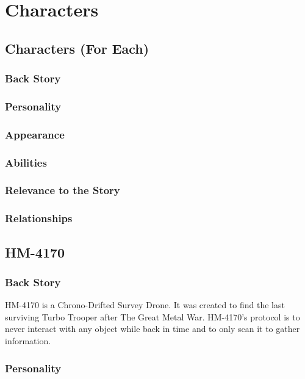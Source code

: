 \documentclass[12pt]{article}
\begin{document}
\section{Characters}

\subsection{Characters (For Each)}

\subsubsection{Back Story}

\subsubsection{Personality}

\subsubsection{Appearance}

\subsubsection{Abilities}

\subsubsection{Relevance to the Story}

\subsubsection{Relationships}

\subsection{HM-4170}

\subsubsection{Back Story}

HM-4170 is a Chrono-Drifted Survey Drone. It was created to find the last surviving Turbo Trooper after The Great Metal War. HM-4170's protocol is to never interact with any object while back in time and to only scan it to gather information.

\subsubsection{Personality}
\end{document}
